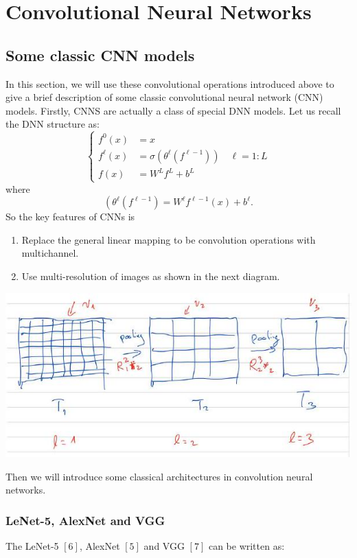 \documentclass[10pt]{article}
\begin{document}
\section{Convolutional Neural Networks}
\subsection{Some classic CNN models}
In this section, we will use these convolutional operations introduced above to give a brief description of some classic convolutional neural network (CNN) models. Firstly, CNNS are actually a class of special DNN models. Let us recall the DNN structure as:
$$
\begin{cases}f^{0}(x) & =x \\ f^{\ell}(x) & =\sigma\left(\theta^{\ell}\left(f^{\ell-1}\right)\right) \quad \ell=1: L \\ f(x) & =W^{L} f^{L}+b^{L}\end{cases}
$$
where
$$
\left(\theta^{\ell}\left(f^{\ell-1}\right)=W^{\ell} f^{\ell-1}(x)+b^{\ell} .\right.
$$
So the key features of CNNs is

    \begin{enumerate}
      \item Replace the general linear mapping to be convolution operations with multichannel.

      \item Use multi-resolution of images as shown in the next diagram.

    \end{enumerate}
\includegraphics[max width=\textwidth]{2022_01_06_73aade67e8906ae5893fg-3}

Then we will introduce some classical architectures in convolution neural networks.

\subsubsection{LeNet-5, AlexNet and VGG}
The LeNet-5 $[6]$, AlexNet $[5]$ and VGG $[7]$ can be written as:
\end{document}
